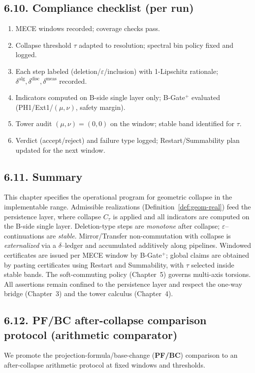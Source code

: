\documentclass[11pt]{article}
\numberwithin{equation}{section}
\theoremstyle{plain}
\theoremstyle{definition}
\theoremstyle{remark}
\DeclareRobustCommand{\hyp}{\nobreakdash-}
\theoremstyle{plain}
\theoremstyle{definition}
\numberwithin{equation}{section}
\theoremstyle{definition}
\numberwithin{equation}{section}
\theoremstyle{plain}
\theoremstyle{definition}
\theoremstyle{remark}
\begin{document}
\subsection*{6.10. Compliance checklist (per run)}\label{subsec:compliance}
\begin{enumerate}
  \item MECE windows recorded; coverage checks pass.
  \item Collapse threshold \(\tau\) adapted to resolution; spectral bin policy fixed and logged.
  \item Each step labeled (deletion/\(\varepsilon\)/inclusion) with 1\hyp Lipschitz rationale; \(\delta^{\mathrm{alg}},\delta^{\mathrm{disc}},\delta^{\mathrm{meas}}\) recorded.
  \item Indicators computed on B\hyp side single layer only; B\hyp Gate$^{+}$ evaluated (PH1/Ext1/$(\mu,\nu)$, safety margin).
  \item Tower audit $(\mu,\nu)=(0,0)$ on the window; stable band identified for \(\tau\).
  \item Verdict (accept/reject) and failure type logged; Restart/Summability plan updated for the next window.
\end{enumerate}

\subsection*{6.11. Summary}
This chapter specifies the operational program for geometric collapse in the implementable range. Admissible realizations (Definition~\ref{def:geom-real}) feed the persistence layer, where collapse $C_\tau$ is applied and all indicators are computed on the B\hyp side single layer. Deletion\hyp type steps are \emph{monotone} after collapse; $\varepsilon$–continuations are \emph{stable}. Mirror/Transfer non\hyp commutation with collapse is \emph{externalized} via a \(\delta\)–ledger and accumulated additively along pipelines. Windowed certificates are issued per MECE window by B\hyp Gate$^{+}$; global claims are obtained by pasting certificates using Restart and Summability, with $\tau$ selected inside stable bands. The soft\hyp commuting policy (Chapter~5) governs multi\hyp axis torsions. All assertions remain confined to the persistence layer and respect the one\hyp way bridge (Chapter~3) and the tower calculus (Chapter~4).


\subsection*{6.12. PF/BC after\hyp collapse comparison protocol (arithmetic comparator)}
We promote the projection\hyp formula/base\hyp change (\textbf{PF/BC}) comparison to an after\hyp collapse arithmetic protocol at fixed windows and thresholds.
\end{document}

